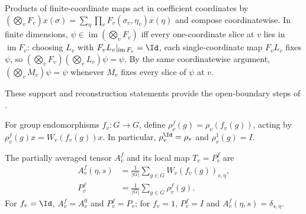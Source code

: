 Products of finite-coordinate maps act in coefficient coordinates by
$(\bigotimes_vF_v)x(\sigma)=\sum_\eta\prod_vF_v(\sigma_v,\eta_v)x(\eta)$
and compose coordinatewise. In finite dimensions, $\psi\in\operatorname{im}(\bigotimes_vF_v)$
iff every one-coordinate slice at $v$ lies in $\operatorname{im}F_v$: choosing
$L_v$ with $F_vL_v|_{\operatorname{im}F_v}=\Id$, each single-coordinate map
$F_vL_v$ fixes $\psi$, so $(\bigotimes_vF_v)(\bigotimes_vL_v)\psi=\psi$.
By the same coordinatewise argument, $(\bigotimes_vM_v)\psi=\psi$ whenever
$M_v$ fixes every slice of $\psi$ at $v$.

These support and reconstruction statements provide the open-boundary
steps of \cite[Theorem~5.4]{Schuch2010PEPS}.

\begin{definition}%
    \label{def:peps_partial_incident_representation}
    \leanok
    For group endomorphisms $f_v:G\to G$, define
    $\rho_v^f(g)=\rho_v(f_v(g))$, acting by
    $\rho_v^f(g)x=W_v(f_v(g))x$. In particular, $\rho_v^{\Id}=\rho_v$ and
    $\rho_v^1(g)=I$.
\end{definition}

\begin{definition}%
    \label{def:peps_partial_averaging_site}
    \leanok
    The partially averaged tensor $A_v^f$ and its local map $T_v=P_v^f$ are
    \begin{align}
        A_v^f(\eta,s)
              & =\frac{1}{|G|}\sum_{g\in G}W_v(f_v(g))_{s,\eta},
        \label{eq:peps_partial_average}                          \\
        P_v^f & =\frac{1}{|G|}\sum_{g\in G}\rho_v^f(g).
        \nonumber
    \end{align}
    For $f_v=\Id$, $A_v^f=A_v^0$ and $P_v^f=P_v$; for $f_v=1$, $P_v^f=I$ and
    $A_v^f(\eta,s)=\delta_{s,\eta}$.
\end{definition}


